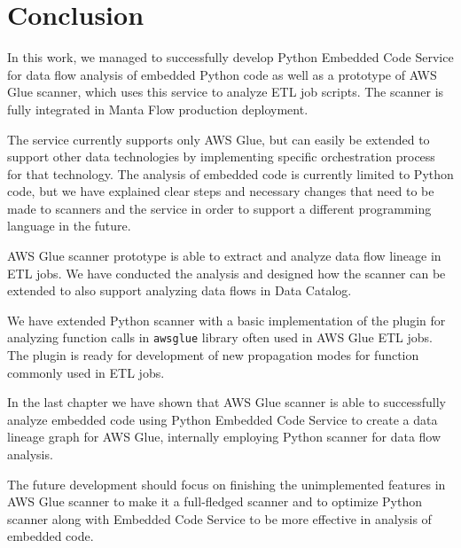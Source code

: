 \chapter{Conclusion}

In this work, we managed to successfully develop Python Embedded Code Service for data flow analysis of embedded Python code as well as a prototype of AWS Glue scanner, which uses this service to analyze ETL job scripts. The scanner is fully integrated in Manta Flow production deployment.
\par
The service currently supports only AWS Glue, but can easily be extended to support other data technologies by implementing specific orchestration process for that technology. The analysis of embedded code is currently limited to Python code, but we have explained clear steps and necessary changes that need to be made to scanners and the service in order to support a different programming language in the future.
\par
AWS Glue scanner prototype is able to extract and analyze data flow lineage in ETL jobs. We have conducted the analysis and designed how the scanner can be extended to also support analyzing data flows in Data Catalog.
\par
We have extended Python scanner with a basic implementation of the plugin for analyzing function calls in \texttt{awsglue} library often used in AWS Glue ETL jobs. The plugin is ready for development of new propagation modes for function commonly used in ETL jobs.
\par
In the last chapter we have shown that AWS Glue scanner is able to successfully analyze embedded code using Python Embedded Code Service to create a data lineage graph for AWS Glue, internally employing Python scanner for data flow analysis.
\par
The future development should focus on finishing the unimplemented features in AWS Glue scanner to make it a full-fledged scanner and to optimize Python scanner along with Embedded Code Service to be more effective in analysis of embedded code.
